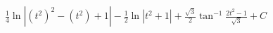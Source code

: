 \documentclass[preview]{standalone}
\begin{document}
\begin{align*}
\frac{1}{4}\ln|(t^2)^2-(t^2)+1|-\frac{1}{2}\ln|t^2+1|+\frac{\sqrt3}{2}\tan^{-1}\frac{2t^2-1}{\sqrt3}+C
\end{align*}
\end{document}
